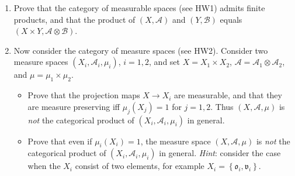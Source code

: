 \documentclass{qlnotes-export}
\begin{document}
\begin{enumerate}
\item
  Prove that the category of measurable spaces (see HW1) admits finite products, and that the product of \((X,\mathcal{A})\) and \((Y,\mathcal{B})\) equals \((X \times Y,\mathcal{A} \otimes \mathcal{B})\).
\item
  Now consider the category of measure spaces (see HW2). Consider two measure spaces \((X_{i},\mathcal{A}_{i},\mu_{i})\), \(i = 1,2\), and set \(X = X_{1} \times X_{2}\), \(\mathcal{A} = \mathcal{A}_{1} \otimes \mathcal{A}_{2}\), and \(\mu = \mu_{1} \times \mu_{2}\).

  \begin{itemize}
  \item
    Prove that the projection maps \(X\rightarrow X_{i}\) are measurable, and that they are measure preserving iff \(\mu_{j}(X_{j}) = 1\) for \(j = 1,2\). Thus \((X,\mathcal{A},\mu)\) is \emph{not} the categorical product of \((X_{i},\mathcal{A}_{i},\mu_{i})\) in general.
  \item
    Prove that even if \(\mu_{i}(X_{i}) = 1\), the measure space \((X,\mathcal{A},\mu)\) is \emph{not} the categorical product of \((X_{i},\mathcal{A}_{i},\mu_{i})\) in general. \emph{Hint}: consider the case when the \(X_{i}\) consist of two elements, for example \(X_{i} = \left\{ {{\mathfrak{o}}_{i},{\mathfrak{v}}_{i}} \right\}\).
  \end{itemize}
\end{enumerate}
\end{document}
